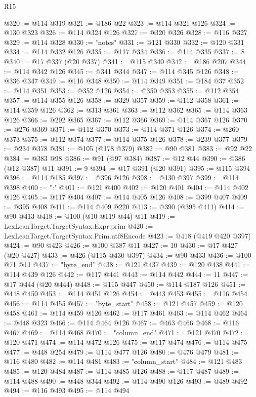\begin{lexlean}{R15}
\begin{coremodule}
@320 := @114 @319
@321 := @186 @22
@323 := @114 @321 @126
@324 := @130 @323
@326 := @114 @324 @126
@327 := @320 @326
@328 := @116 @327
@329 := @114 @328
@330 := "notes"
@331 := @121 @330
@332 := @120 @331
@334 := @114 @332 @126
@335 := @117 @334
@336 := @114 @335
@337 := 8
@340 := @17 @337 (@20 @337)
@341 := @115 @340
@342 := @186 @207
@344 := @114 @342 @126
@345 := @341 @344
@347 := @114 @345 @126
@348 := @336 @347
@349 := @116 @348
@350 := @114 @349
@351 := @184 @37
@352 := @114 @351
@353 := @352 @126
@354 := @350 @353
@355 := @112 @354
@357 := @114 @355 @126
@358 := @329 @357
@359 := @112 @358
@361 := @114 @359 @126
@362 := @313 @361
@363 := @112 @362
@365 := @114 @363 @126
@366 := @292 @365
@367 := @112 @366
@369 := @114 @367 @126
@370 := @276 @369
@371 := @112 @370
@373 := @114 @371 @126
@374 := @260 @373
@375 := @112 @374
@377 := @114 @375 @126
@378 := @239 @377
@379 := @234 @378
@381 := @105 (@178 @379)
@382 := @90 @381
@383 := @92 @22
@384 := @383 @98
@386 := @91 (@97 @384)
@387 := @12 @44
@390 := @386 (@12 @387) @11
@391 := 9
@394 := @17 @391 (@20 @391)
@395 := @115 @394
@396 := @114 @185
@397 := @396 @126
@398 := @130 @397
@399 := @114 @398
@400 := ":"
@401 := @121 @400
@402 := @120 @401
@404 := @114 @402 @126
@405 := @117 @404
@407 := @114 @405 @126
@408 := @399 @407
@409 := @395 @408
@411 := @114 @409 @220
@413 := @390 (@395 @411)
@414 := @90 @413
@418 := @100 (@10 @119 @44) @11
@419 := LexLeanTarget.TargetSyntax.Expr.prim
@420 := LexLeanTarget.TargetSyntax.Prim.utf8Encode
@423 := @418 (@419 @420 @397)
@424 := @90 @423
@426 := @100 @387 @11
@427 := 10
@430 := @17 @427 (@20 @427)
@433 := @426 (@115 @430 @397)
@434 := @90 @433
@436 := @100 @71 @11
@437 := "byte_end"
@438 := @121 @437
@439 := @120 @438
@441 := @114 @439 @126
@442 := @117 @441
@443 := @114 @442
@444 := 11
@447 := @17 @444 (@20 @444)
@448 := @115 @447
@450 := @114 @187 @126
@451 := @448 @450
@453 := @114 @451 @126
@454 := @443 @453
@455 := @116 @454
@456 := @114 @455
@457 := "byte_start"
@458 := @121 @457
@459 := @120 @458
@461 := @114 @459 @126
@462 := @117 @461
@463 := @114 @462
@464 := @448 @323
@466 := @114 @464 @126
@467 := @463 @466
@468 := @116 @467
@469 := @114 @468
@470 := "column_end"
@471 := @121 @470
@472 := @120 @471
@474 := @114 @472 @126
@475 := @117 @474
@476 := @114 @475
@477 := @448 @254
@479 := @114 @477 @126
@480 := @476 @479
@481 := @116 @480
@482 := @114 @481
@483 := "column_start"
@484 := @121 @483
@485 := @120 @484
@487 := @114 @485 @126
@488 := @117 @487
@489 := @114 @488
@490 := @448 @344
@492 := @114 @490 @126
@493 := @489 @492
@494 := @116 @493
@495 := @114 @494

\end{coremodule}
\end{lexlean}
